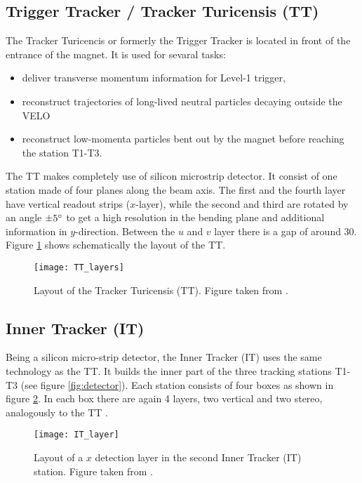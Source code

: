 \subsection{Trigger Tracker / Tracker Turicensis (TT)}
The Tracker Turicencis or formerly the Trigger Tracker is located in front of the entrance of the \lhcb magnet. It is used for sevaral tasks:
\begin{itemize}
    \item deliver transverse momentum information for Level-1 trigger,
    \item reconstruct trajectories of long-lived neutral particles decaying outside the VELO
    \item reconstruct low-momenta particles bent out by the magnet before reaching the station T1-T3.
\end{itemize}

The TT makes completely use of silicon microstrip detector. It consist of one station made of four planes along the beam axis. The first and the fourth layer have vertical readout strips ($x$-layer), while the second and third are rotated by an angle $\pm 5^{\circ}$ to get a high resolution in the
bending plane and additional information in $y$-direction.
Between the $u$ and $v$ layer there is a gap of around 30\cm. Figure \ref{fig:TT_layers} shows schematically the layout of the TT.
\begin{figure}[hptb]
    \centering
	\texttt{[image: TT\_layers]}	
	\caption{Layout of the Tracker Turicensis (TT). 
             Figure taken from \cite{ST_Performance}.}
	\label{fig:TT_layers}
\end{figure}

\subsection{Inner Tracker (IT)}
Being a silicon micro-strip detector, the Inner Tracker (IT) uses the same technology as the TT. 
It builds the inner part of the three tracking stations T1-T3 (see figure \ref{fig:detector}).
Each station consists of four boxes as shown in figure \ref{fig:IT_layer}.
In each box there are again 4 layers, two vertical and two stereo, analogously to the TT \cite{detector, ST_Performance}.
\begin{figure}[hptb]
    \centering
	\texttt{[image: IT\_layer]}	
	\caption{Layout of a $x$ detection layer in the second Inner Tracker (IT) station. 
             Figure taken from \cite{detector}.}
	\label{fig:IT_layer}
\end{figure}

